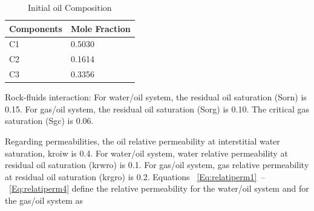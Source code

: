 \begin{table}[]
\center
{}
\caption{properties of oil components}
\label{tab:steam_fluid_components}
\end{table}

\begin{table}[]
\center
\begin{tabular}{|l|l|}
\hline
Components & Mole Fraction \\ \hline
C1         & 0.5030        \\ \hline
C2         & 0.1614        \\ \hline
C3         & 0.3356        \\ \hline
\end{tabular}%
\caption{Initial oil Composition}
\label{tab:steam_composition}
\end{table}

Rock-fluids interaction:
For water/oil system, the residual oil saturation (Sorn) is 0.15. For gas/oil system, the residual oil saturation (Sorg) is 0.10. The critical gas saturation (Sgc)  is 0.06.

Regarding permeabilities, the oil relative permeability at interstitial water saturation, kroiw is 0.4. For water/oil system, water relative permeability at residual oil saturation (krwro) is 0.1. For gas/oil system, gas relative permeability at residual oil saturation (krgro) is 0.2. Equations ~\eqref{Eq:relatiperm1}~--~\eqref{Eq:relatiperm4} define the relative permeability for the water/oil system and for the gas/oil system as

